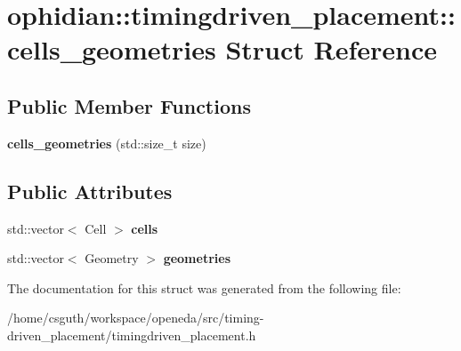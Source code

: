 \hypertarget{structophidian_1_1timingdriven__placement_1_1cells__geometries}{\section{ophidian\-:\-:timingdriven\-\_\-placement\-:\-:cells\-\_\-geometries Struct Reference}
\label{structophidian_1_1timingdriven__placement_1_1cells__geometries}
}
\subsection*{Public Member Functions}
\begin{DoxyCompactItemize}
\item 
\hypertarget{structophidian_1_1timingdriven__placement_1_1cells__geometries_ae235699810e7d8d4f6fa57e509bccfe8}{{\bfseries cells\-\_\-geometries} (std\-::size\-\_\-t size)}\label{structophidian_1_1timingdriven__placement_1_1cells__geometries_ae235699810e7d8d4f6fa57e509bccfe8}

\end{DoxyCompactItemize}
\subsection*{Public Attributes}
\begin{DoxyCompactItemize}
\item 
\hypertarget{structophidian_1_1timingdriven__placement_1_1cells__geometries_aee99e9ac21812588671789e318d3b461}{std\-::vector$<$ Cell $>$ {\bfseries cells}}\label{structophidian_1_1timingdriven__placement_1_1cells__geometries_aee99e9ac21812588671789e318d3b461}

\item 
\hypertarget{structophidian_1_1timingdriven__placement_1_1cells__geometries_ab4cdf584efb87caf2d5e636ed9f29174}{std\-::vector$<$ Geometry $>$ {\bfseries geometries}}\label{structophidian_1_1timingdriven__placement_1_1cells__geometries_ab4cdf584efb87caf2d5e636ed9f29174}

\end{DoxyCompactItemize}


The documentation for this struct was generated from the following file\-:\begin{DoxyCompactItemize}
\item 
/home/csguth/workspace/openeda/src/timing-\/driven\-\_\-placement/timingdriven\-\_\-placement.\-h\end{DoxyCompactItemize}
